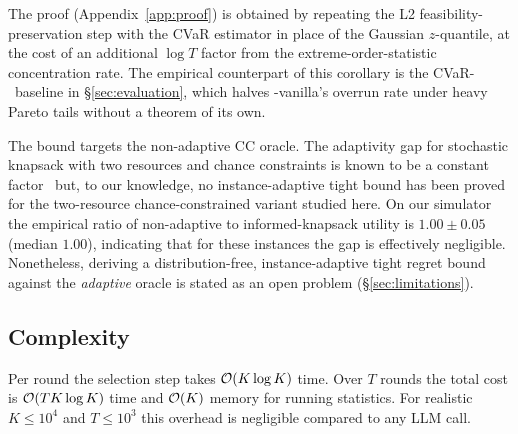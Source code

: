 The proof (Appendix~\ref{app:proof}) is obtained by repeating the L2
feasibility-preservation step with the CVaR estimator in place of the
Gaussian $z$-quantile, at the cost of an additional $\log T$ factor
from the extreme-order-statistic concentration rate. The empirical
counterpart of this corollary is the CVaR-\BwK~baseline in
\S\ref{sec:evaluation}, which halves \BwK-vanilla's overrun rate under
heavy Pareto tails without a theorem of its own.

\begin{remark}
\label{rem:adaptivegap}
The bound targets the non-adaptive CC oracle. The adaptivity gap for
stochastic knapsack with two resources and chance constraints is
known to be a constant
factor~\cite{dean2008stochastic} but, to our knowledge, no
instance-adaptive tight bound has been proved for the two-resource
chance-constrained variant studied here. On our simulator the
empirical ratio of non-adaptive to informed-knapsack utility is
$1.00 \pm 0.05$ (median $1.00$), indicating that for these instances
the gap is effectively negligible. Nonetheless, deriving a
distribution-free, instance-adaptive tight regret bound against the
\emph{adaptive} oracle is stated as an open problem
(\S\ref{sec:limitations}).
\end{remark}

\subsection{Complexity}
Per round the selection step takes $\mathcal{O}(K \log K)$ time. Over $T$
rounds the total cost is $\mathcal{O}(T K \log K)$ time and $\mathcal{O}(K)$ memory
for running statistics. For realistic $K \le 10^4$ and $T \le 10^3$
this overhead is negligible compared to any LLM call.
